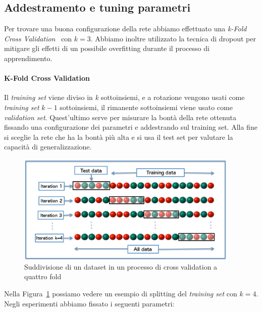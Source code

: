 \documentclass[11pt,a4paper,twoside,
openright]{book}
\begin{document}
\subsection{Addestramento e tuning parametri}
\label{modselmnist}
Per trovare una buona configurazione della rete abbiamo effettuato una \textit{k-Fold Cross Validation}~\cite{Refaeilzadeh2009} con $k=3$. Abbiamo inoltre utilizzato la tecnica di dropout per mitigare gli effetti di un possibile overfitting durante il processo di apprendimento.
\paragraph*{K-Fold Cross Validation}
Il \textit{training set} viene diviso in \textit{k} sottoinsiemi, e a rotazione vengono usati come \textit{training set} $k-1$ sottoinsiemi, il rimanente sottoinsiemi viene usato come \textit{validation set}. Quest'ultimo serve per misurare la bontà della rete ottenuta fissando una configurazione dei parametri e addestrando sul training set. Alla fine si sceglie la rete che ha la bontà più alta e si usa il test set per valutare la capacità di generalizzazione.
\begin{figure}
\begin{center}
\includegraphics[width=300pt]{K-fold_cross_validation_EN.jpg}
\caption{Suddivisione di un dataset in un processo di cross validation a quattro fold}\label{fig:kfold}
\end{center}
\end{figure}
Nella Figura~\ref{fig:kfold} possiamo vedere un esempio di splitting del \textit{training set} con $k=4$.\\
Negli esperimenti abbiamo fissato i seguenti parametri:
\end{document}
